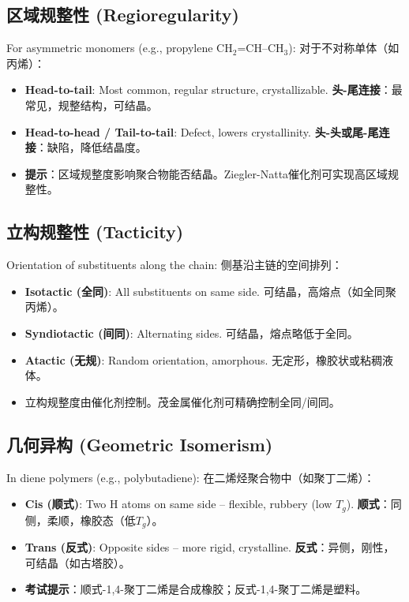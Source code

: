 \documentclass[12pt,a4paper]{ctexart}
\begin{document}
\subsection{区域规整性 (Regioregularity)}
For asymmetric monomers (e.g., propylene CH$_2$=CH–CH$_3$):  
对于不对称单体（如丙烯）：
\begin{itemize}
    \item \textbf{Head-to-tail}: Most common, regular structure, crystallizable.  
    \textbf{头-尾连接}：最常见，规整结构，可结晶。
    \item \textbf{Head-to-head / Tail-to-tail}: Defect, lowers crystallinity.  
    \textbf{头-头或尾-尾连接}：缺陷，降低结晶度。
    \item \textbf{提示}：区域规整度影响聚合物能否结晶。Ziegler-Natta催化剂可实现高区域规整性。
\end{itemize}

\subsection{立构规整性 (Tacticity)}
Orientation of substituents along the chain: 侧基沿主链的空间排列：
\begin{itemize}
    \item \textbf{Isotactic (全同)}: All substituents on same side. 可结晶，高熔点（如全同聚丙烯）。
    \item \textbf{Syndiotactic (间同)}: Alternating sides. 可结晶，熔点略低于全同。
    \item \textbf{Atactic (无规)}: Random orientation, amorphous. 无定形，橡胶状或粘稠液体。
    \item 立构规整度由催化剂控制。茂金属催化剂可精确控制全同/间同。
\end{itemize}

\subsection{几何异构 (Geometric Isomerism)}
In diene polymers (e.g., polybutadiene): 在二烯烃聚合物中（如聚丁二烯）：
\begin{itemize}
    \item \textbf{Cis (顺式)}: Two H atoms on same side – flexible, rubbery (low $T_g$).  
    \textbf{顺式}：同侧，柔顺，橡胶态（低$T_g$）。
    \item \textbf{Trans (反式)}: Opposite sides – more rigid, crystalline.  
    \textbf{反式}：异侧，刚性，可结晶（如古塔胶）。
    \item \textbf{考试提示}：顺式-1,4-聚丁二烯是合成橡胶；反式-1,4-聚丁二烯是塑料。
\end{itemize}
\end{document}
